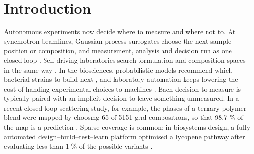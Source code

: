 \documentclass{iopjournal}
\begin{document}
\hypertarget{sec:1}{%
\section{Introduction}\label{sec:1}}

Autonomous experiments now decide where to measure and where not to. At synchrotron beamlines, Gaussian-process surrogates choose the next sample position or composition, and measurement, analysis and decision run as one closed loop \cite{Noack2019,Noack2020,Yager2023}. Self-driving laboratories search formulation and composition spaces in the same way \cite{Burger2020,Nazeri2026,Szymanski2023}. In the biosciences, probabilistic models recommend which bacterial strains to build next \cite{Radivojevic2020}, and laboratory automation keeps lowering the cost of handing experimental choices to machines \cite{Tom2024}. Each decision to measure is typically paired with an implicit decision to leave something unmeasured. In a recent closed-loop scattering study, for example, the phases of a ternary polymer blend were mapped by choosing 65 of 5151 grid compositions, so that 98.7 \% of the map is a prediction \cite{Upreti2026}. Sparse coverage is common: in biosystems design, a fully automated design--build--test--learn platform optimised a lycopene pathway after evaluating less than 1 \% of the possible variants \cite{HamediRad2019}.
\end{document}
